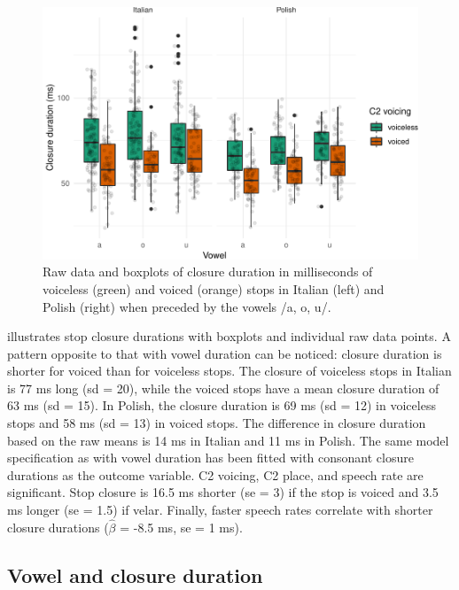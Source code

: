 \documentclass[preprint]{JASAnew}
\begin{document}
\begin{figure}
\includegraphics[width=\linewidth]{2018-jasa_files/figure-latex/closure-plot-1} \caption{Raw data and boxplots of closure duration in milliseconds of voiceless (green) and voiced (orange) stops in Italian (left) and Polish (right) when preceded by the vowels /a, o, u/.}\label{f:closure-plot}
\end{figure}

 illustrates stop closure durations with boxplots
and individual raw data points. A pattern opposite to that with vowel
duration can be noticed: closure duration is shorter for voiced than for
voiceless stops. The closure of voiceless stops in Italian is 77 ms long
(sd = 20), while the voiced stops have a mean closure duration of 63 ms
(sd = 15). In Polish, the closure duration is 69 ms (sd = 12) in
voiceless stops and 58 ms (sd = 13) in voiced stops. The difference in
closure duration based on the raw means is 14 ms in Italian and 11 ms in
Polish. The same model specification as with vowel duration has been
fitted with consonant closure durations as the outcome variable. C2
voicing, C2 place, and speech rate are significant. Stop closure is 16.5
ms shorter (se = 3) if the stop is voiced and 3.5 ms longer (se = 1.5)
if velar. Finally, faster speech rates correlate with shorter closure
durations (\(\hat{\beta}\) = -8.5 ms, se = 1 ms).

\hypertarget{vowel-and-closure-duration}{%
\subsection{Vowel and closure
duration}\label{vowel-and-closure-duration}}
\end{document}
